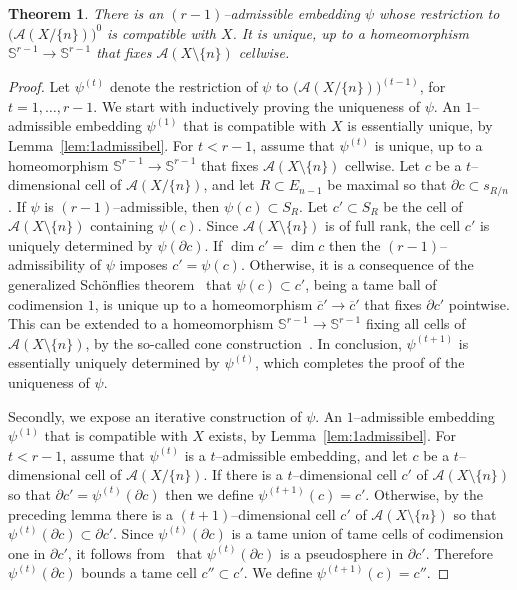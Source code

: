 \documentclass[a4paper]{amsart}
\newcommand{\p}{\mathbb S}
\renewcommand{\d}{\partial}
\newtheorem{theorem}{Theorem}
\theoremstyle{definition}
\theoremstyle{remark}
\begin{document}
\begin{theorem}\label{thm:psi_exists}
  There is an $(r-1)$--admissible embedding $\psi$ whose restriction to
  $\big(\mathcal A(X/\{n\})\big)^0$ is compatible with $X$. It is
  unique, up to a homeomorphism $\p^{r-1}\to \p^{r-1}$ that fixes
  $\mathcal A(X\setminus\{n\})$ cellwise.
\end{theorem}
\begin{proof}
  Let $\psi^{(t)}$ denote the restriction of $\psi$ to $\big(\mathcal
  A(X/\{n\})\big)^{(t-1)}$, for $t=1,\dots, r-1$.  
  We start with inductively proving the uniqueness of $\psi$.
  An $1$--admissible embedding $\psi^{(1)}$ that is compatible with $X$
  is essentially unique, by Lemma~\ref{lem:1admissibel}.
%
  For $t<r-1$, assume that $\psi^{(t)}$ is unique, up to a
  homeomorphism $\p^{r-1}\to \p^{r-1}$ that
  fixes $\mathcal A(X\setminus \{n\})$  cellwise.
%
  Let $c$ be a $t$--dimensional cell of $\mathcal A(X/\{n\})$, and let
  $R\subset E_{n-1}$ be maximal so that $\d c\subset s_{R/n}$.
  If $\psi$ is $(r-1)$--admissible, then $\psi(c)\subset S_R$. Let 
  $c'\subset S_R$ be the cell of $\mathcal A(X\setminus \{n\})$ containing
  $\psi(c)$. Since $\mathcal A(X\setminus \{n\})$
  is of full rank, the cell $c'$ is uniquely determined by $\psi(\d c)$.
%
  If $\dim c'=\dim c$ then the $(r-1)$--admissibility of $\psi$ imposes
  $c'=\psi (c)$.  Otherwise, it is a consequence of the generalized
  Sch{\"o}nflies theorem~\cite{brown} that $\psi(c)\subset c'$, being a
  tame ball of codimension $1$, is unique up to a homeomorphism
  $\overline c'\to \overline c'$ that fixes $\d c'$ pointwise.
%
  This can be extended to a homeomorphism $\p^{r-1}\to \p^{r-1}$ fixing
  all cells of $\mathcal A(X\setminus \{n\})$, by the so-called cone
  construction~\cite{stoeckerzieschang}.
  In conclusion, $\psi^{(t+1)}$ is essentially uniquely determined by $\psi^{(t)}$,
  which completes the proof of the uniqueness of $\psi$.
  
  Secondly, we expose an iterative construction of $\psi$.  An
  $1$--admissible embedding $\psi^{(1)}$ that is compatible with $X$
  exists, by Lemma~\ref{lem:1admissibel}.
%
  For $t<r-1$, assume that $\psi^{(t)}$ is a $t$--admissible embedding,
  and let $c$ be a $t$--dimensional cell of $\mathcal A(X/\{n\})$.  If
  there is a $t$--dimensional cell $c'$ of $\mathcal A(X\setminus
  \{n\})$ so that $\d c'=\psi^{(t)}(\d c)$ then we define
  $\psi^{(t+1)}(c) = c'$.
%
  Otherwise, by the preceding lemma there is a $(t+1)$--dimensional cell
  $c'$ of $\mathcal A(X\setminus \{n\})$ so that $\psi^{(t)}(\d
  c)\subset \d c'$. 
%
  Since $\psi^{(t)}(\d c)$ is a tame union of tame cells of codimension
  one in $\d c'$, it follows from~\cite{kirby} that $\psi^{(t)}(\d c)$
  is a pseudosphere in $\d c'$.  Therefore $\psi^{(t)}(\d c)$ bounds a
  tame cell $c''\subset c'$.  We define $\psi^{(t+1)}(c) = c''$.
  

\end{proof}
\end{document}

